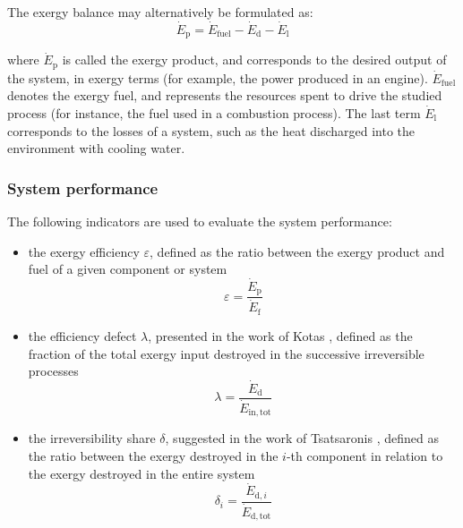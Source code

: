 \documentclass[preprint,12pt]{elsarticle}
\begin{document}
The exergy balance may alternatively be formulated as:
\begin{equation}
\dot{E}_{\mathrm{p}} = \dot{E}_{\mathrm{fuel}} - \dot{E}_{\mathrm{d}} - \dot{E}_{\mathrm{l}} 
\end{equation}

where $\dot{E}_{\mathrm{p}}$ is called the exergy product, and corresponds to the desired output of the system, in exergy terms (for example, the power produced in an engine). $\dot{E}_{\mathrm{fuel}}$ denotes the exergy fuel, and represents the resources spent to drive the studied process (for instance, the fuel used in a combustion process). The last term $\dot{E}_{\mathrm{l}}$ corresponds to the losses of a system, such as the heat discharged into the environment with cooling water. 

\subsubsection{System performance}

The following indicators are used to evaluate the system performance:
\begin{itemize}
	\item the exergy efficiency $\varepsilon$, defined as the ratio between the exergy product and fuel of a given component or system
	\begin{equation} \varepsilon = \frac{\dot{E}_{\mathrm{p}}}{\dot{E}_{\mathrm{f}}} \end{equation}
	\item the efficiency defect $\lambda$, presented in the work of Kotas \cite{Kotas2013}, defined as the fraction of the total exergy input destroyed in the successive irreversible processes
	\begin{equation} \lambda = \frac{\dot{E}_{\mathrm{d}}}{\dot{E}_{\mathrm{in,tot}}} \end{equation}
	\item  the irreversibility share $\delta$, suggested in the work of Tsatsaronis \cite{Tsatsaronis1993}, defined as the ratio between the exergy destroyed in the $i$-th component in relation to the exergy destroyed in the entire system
	\begin{equation} \delta_i = \frac{\dot{E}_{\mathrm{d},i}}{\dot{E}_{\mathrm{d,tot}}} \end{equation}
	
\end{itemize}    

\end{document}
